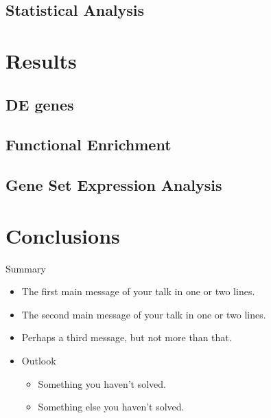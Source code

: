 \documentclass{beamer}
\begin{document}
\subsection{Statistical Analysis}



\section{Results}


\subsection{DE genes}


\subsection{Functional Enrichment}

\subsection{Gene Set Expression Analysis}



\section{Conclusions}

\begin{frame}{Summary}
  \begin{itemize}
  \item
    The \alert{first main message} of your talk in one or two lines.
  \item
    The \alert{second main message} of your talk in one or two lines.
  \item
    Perhaps a \alert{third message}, but not more than that.
  \end{itemize}
  
  \begin{itemize}
  \item
    Outlook
    \begin{itemize}
    \item
      Something you haven't solved. 
    \item
      Something else you haven't solved.
    \end{itemize}
  \end{itemize}
\end{frame}
\end{document}
